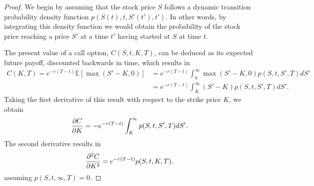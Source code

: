 \begin{proof}

We begin by assuming that the stock price $S$ follows a dynamic transition probability density function $p(S(t),t,S'(t'),t')$. In other words, by integrating this density function we would obtain the probability of the stock price reaching a price $S'$ at a time $t'$ having started at $S$ at time $t$.

The present value of a call option, $C(S,t,K,T)$, can be deduced as its expected future payoff, discounted backwards in time, which results in
\begin{equation}
\begin{split}\label{deriv0}
C(K,T)=e^{-r(T-t)}\mathbb{E}\left[\max\left(S'-K,0\right)\right]&=e^{-r(T-t)}\int_0^\infty\max\left(S'-K,0\right)p(S,t,S',T)dS'\\
&=e^{-r(T-t)}\int_K^\infty(S'-K)p(S,t,S',T)dS'.
\end{split}
\end{equation}
Taking the first derivative of this result with respect to the strike price $K$, we obtain
\begin{equation}\label{dcdk}
\pdv{C}{K}=-e^{-r(T-t)}\int_K^\infty p(S,t,S',T)dS'.
\end{equation}
The second derivative results in
\begin{equation}\label{d2cdk2}
\pdv{^2C}{K^2}=e^{-r(T-t)}p(S,t,K,T).
\end{equation}
\noindent assuming $p(S,t,\infty,T)=0$.


\end{proof}
